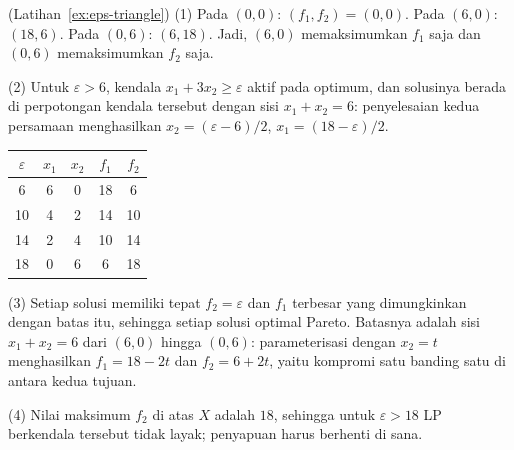 \begin{solution}(Latihan~\ref{ex:eps-triangle})
(1) Pada $(0,0)$: $(f_1, f_2) = (0,0)$. Pada $(6,0)$: $(18, 6)$. Pada $(0,6)$: $(6, 18)$. Jadi, $(6,0)$ memaksimumkan $f_1$ saja dan $(0,6)$ memaksimumkan $f_2$ saja.

(2) Untuk $\varepsilon > 6$, kendala $x_1 + 3x_2 \geq \varepsilon$ aktif pada optimum, dan solusinya berada di perpotongan kendala tersebut dengan sisi $x_1 + x_2 = 6$: penyelesaian kedua persamaan menghasilkan $x_2 = (\varepsilon - 6)/2$, $x_1 = (18 - \varepsilon)/2$.
\begin{center}
\begin{tabular}{c|cccc}
$\varepsilon$ & $x_1$ & $x_2$ & $f_1$ & $f_2$ \\\hline
6  & 6 & 0 & 18 & 6 \\
10 & 4 & 2 & 14 & 10 \\
14 & 2 & 4 & 10 & 14 \\
18 & 0 & 6 & 6  & 18 \\
\end{tabular}
\par{}\label{tab:multi-objective-optimization_updated-tab05}%

\end{center}

(3) Setiap solusi memiliki tepat $f_2 = \varepsilon$ dan $f_1$ terbesar yang dimungkinkan dengan batas itu, sehingga setiap solusi optimal Pareto. Batasnya adalah sisi $x_1 + x_2 = 6$ dari $(6,0)$ hingga $(0,6)$: parameterisasi dengan $x_2 = t$ menghasilkan $f_1 = 18 - 2t$ dan $f_2 = 6 + 2t$, yaitu kompromi satu banding satu di antara kedua tujuan.

(4) Nilai maksimum $f_2$ di atas $X$ adalah $18$, sehingga untuk $\varepsilon > 18$ LP berkendala tersebut tidak layak; penyapuan harus berhenti di sana.
\end{solution}

